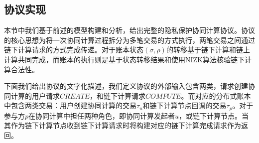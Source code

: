 \subsection{协议实现}
本节中我们基于前述的模型构建和分析，给出完整的隐私保护协同计算协议。协议的核心思想为将一次协同计算过程拆分为多笔交易的方式执行，两笔交易之间通过链下计算请求的方式完成传递。对于账本状态$(\sigma, \rho)$的转移基于链下计算和链上计算共同完成，而账本的执行则是基于状态转移结果和使用NIZK算法核验链下计算合法性。

下面我们给出协议的文字化描述，我们定义协议的外部输入包含两类，请求创建协同计算的用户请求$CREATE$，和链下计算请求$COMPUTE$。而对应的分布式账本中包含两类交易：用户创建协同计算的交易$\tau_u$和链下计算节点回调的交易$\tau_p$。对于参与方$p$在协同计算中担任两种角色，即协同计算发起者$u$，或链下计算节点。当其作为链下计算节点收到链下计算请求时将构建对应的链下计算完成请求作为返回。
